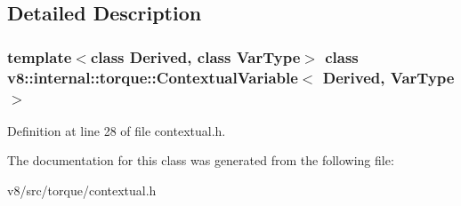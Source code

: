 \subsection{Detailed Description}
\subsubsection*{template$<$class Derived, class Var\+Type$>$\newline
class v8\+::internal\+::torque\+::\+Contextual\+Variable$<$ Derived, Var\+Type $>$}



Definition at line 28 of file contextual.\+h.



The documentation for this class was generated from the following file\+:\begin{DoxyCompactItemize}
\item 
v8/src/torque/contextual.\+h\end{DoxyCompactItemize}
